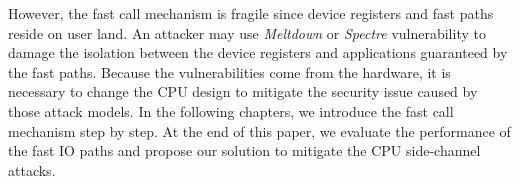 However, the fast call mechanism is fragile since device registers and fast paths reside on user land. 
An attacker may use \emph{Meltdown}\cite{3} or \emph{Spectre}\cite{4} vulnerability to damage the isolation between the device registers 
and applications guaranteed by the fast paths. Because the vulnerabilities come from the hardware, it is 
necessary to change the CPU design to mitigate the security issue caused by those attack models. In the 
following chapters, we introduce the fast call mechanism step by step. At the end of this paper, we 
evaluate the performance of the fast IO paths and propose our solution to mitigate the CPU side-channel attacks\cite{3,4}.
\cleardoublepage

